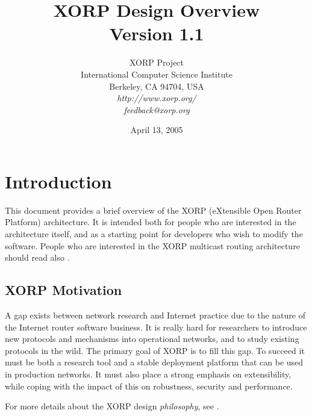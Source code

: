 \documentclass[11pt]{article}
\begin{document}
\title{XORP Design Overview \\
\vspace{1ex}
Version 1.1}
\author{ XORP Project					\\
	 International Computer Science Institute	\\
	 Berkeley, CA 94704, USA			\\
         {\it http://www.xorp.org/}			\\
	 {\it feedback@xorp.org}
}
\date{April 13, 2005}

\maketitle

\thispagestyle{empty}


\section{Introduction}

This document provides a brief overview of the XORP (eXtensible Open
Router Platform) architecture. It is intended both for people who are
interested in the architecture itself, and as a starting point for developers
who wish to modify the software.  People who are interested in the XORP
multicast routing architecture should read also
\cite{xorp:multicast_arch}.

\subsection{XORP Motivation}

A gap exists between network research and Internet practice due to the
nature of the Internet router software business.  It is really hard
for researchers to introduce new protocols and mechanisms into
operational networks, and to study existing protocols in the wild.
The primary goal of XORP is to fill this gap.  To succeed it must be both
a research tool and a stable deployment platform that can be used in
production networks.  It must also place a strong emphasis on
extensibility, while coping with the impact of this on robustness,
security and performance.

For more details about the XORP design {\it philosophy}, see
\cite{handley:hotnets2002:xorp}.

\end{document}
